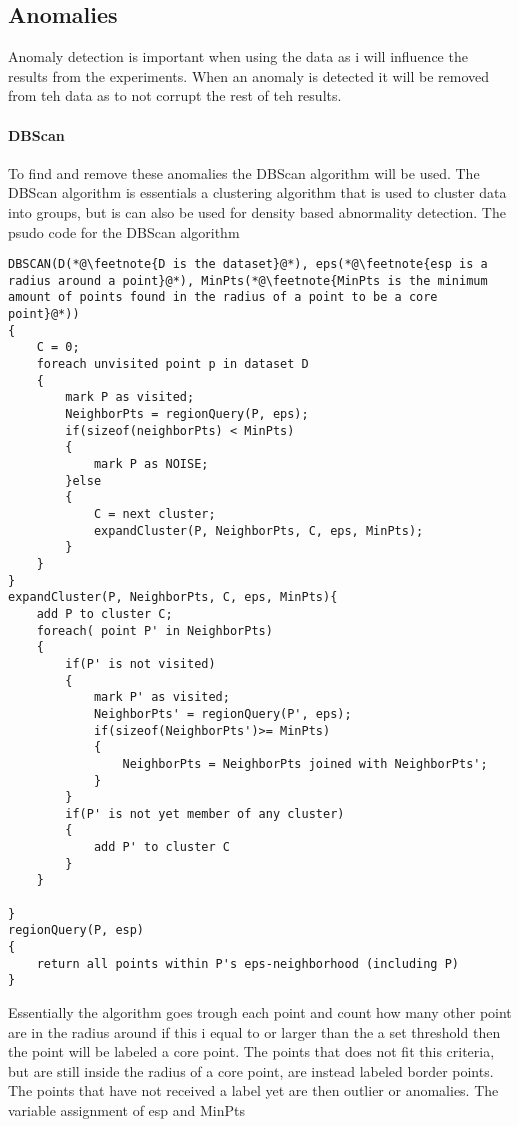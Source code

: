 \subsection{Anomalies}
Anomaly detection is important when using the data as i will influence the results from the experiments. When an anomaly is detected it will be removed from teh data as to not corrupt the rest of teh results.
\paragraph{DBScan}
To find and remove these anomalies the DBScan algorithm will be used. The DBScan algorithm is essentials a clustering algorithm that is used to cluster data into groups, but is can also be used for density based abnormality detection. The psudo code for the DBScan algorithm
\begin{lstlisting}
DBSCAN(D(*@\feetnote{D is the dataset}@*), eps(*@\feetnote{esp is a radius around a point}@*), MinPts(*@\feetnote{MinPts is the minimum amount of points found in the radius of a point to be a core point}@*))
{
    C = 0;
    foreach unvisited point p in dataset D
    {
        mark P as visited;
        NeighborPts = regionQuery(P, eps);
        if(sizeof(neighborPts) < MinPts)
        {
            mark P as NOISE;
        }else
        {
            C = next cluster;
            expandCluster(P, NeighborPts, C, eps, MinPts);
        }
    }
}
expandCluster(P, NeighborPts, C, eps, MinPts){
    add P to cluster C;
    foreach( point P' in NeighborPts)
    {
        if(P' is not visited)
        {
            mark P' as visited;
            NeighborPts' = regionQuery(P', eps);
            if(sizeof(NeighborPts')>= MinPts)
            {
                NeighborPts = NeighborPts joined with NeighborPts';
            }
        }
        if(P' is not yet member of any cluster)
        {
            add P' to cluster C
        }
    }

}
regionQuery(P, esp)
{
    return all points within P's eps-neighborhood (including P)
}
\end{lstlisting}

Essentially the algorithm goes trough each point and count how many other point are in the radius around if this i equal to or larger than the a set threshold then the point will be labeled a core point. The points that does not fit this criteria, but are still inside the radius of a core point, are instead labeled border points. The points that have not received a label yet are then outlier or anomalies. The variable assignment of esp and MinPts 


